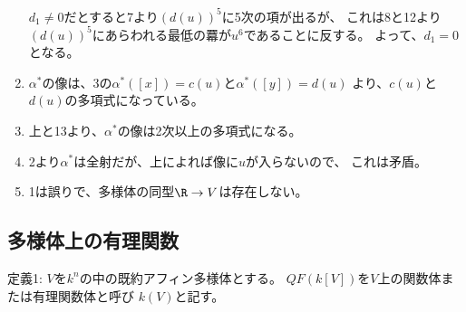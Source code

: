 \begin{myproof}
\begin{enumerate}
    $d_1\neq 0$だとすると7より$(d(u))^5$に5次の項が出るが、
    これは8と12より$(d(u))^5$にあらわれる最低の羃が$u^6$であることに反する。
    よって、$d_1 = 0$となる。
    \item
    $\alpha^*$の像は、3の$\alpha^*([x]) = c(u)$と$\alpha^*([y]) = d(u)$
    より、$c(u)$と$d(u)$の多項式になっている。
    \item
    上と13より、$\alpha^*$の像は2次以上の多項式になる。
    \item
    2より$\alpha^*$は全射だが、上によれば像に$u$が入らないので、
    これは矛盾。
    \item 1は誤りで、多様体の同型$\R \to V$は存在しない。
  \end{enumerate}
\end{myproof}

\subsection{多様体上の有理関数}
\label{sub:多様体上の有理関数}

\begin{framed}
  定義1:
  $V$を$k^n$の中の既約アフィン多様体とする。
  $QF(k[V])$を$V$上の関数体または有理関数体と呼び
  $k(V)$と記す。
\end{framed}

